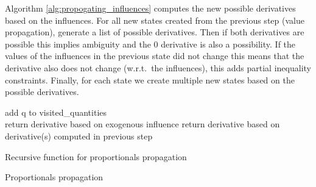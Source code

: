 \documentclass[a4paper]{article}
\begin{document}
Algorithm \ref{alg:propogating_influences} computes the new possible derivatives based on the influences. For all new states created from the previous step (value propagation), generate a list of possible derivatives. Then if both derivatives are possible this implies ambiguity and the 0 derivative is also a possibility. If the values of the influences in the previous state did not change this means that the derivative also does not change (w.r.t.\ the influences), this adds partial inequality constraints. Finally, for each state we create multiple new states based on the possible derivatives.

\vspace{12pt}
\begin{algorithm}[H]
     {
		add q to visited\_quantities\\
		 {
			 {
				return derivative based on exogenous influence
			}
			 {
				return derivative based on derivative(s) computed in previous step
			}
		}
	}
	\caption{Recursive function for proportionals propagation}
	\label{alg:propogating_proportionals_re}
\end{algorithm}

\vspace{12pt}
\begin{algorithm}[H]
	\caption{Proportionals propagation}
	\label{alg:propogating_proportionals}
\end{algorithm}
\vspace{12pt}
\end{document}
